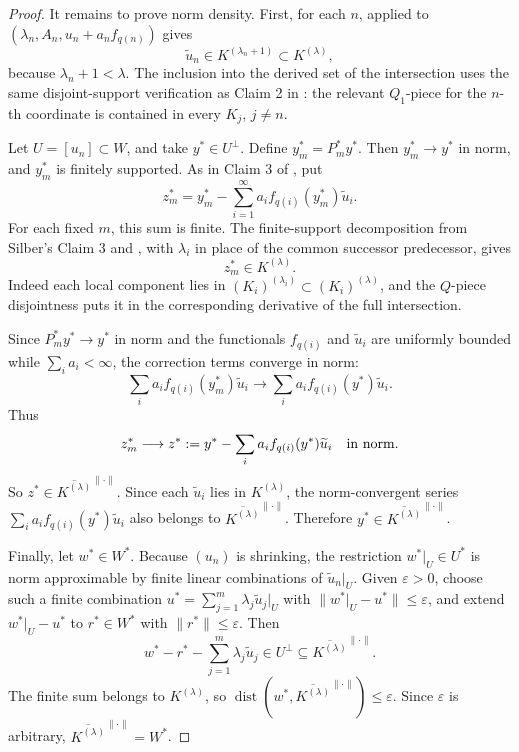 \documentclass[11pt]{article}
\newcommand{\clnorm}[1]{\overline{#1}^{\|\cdot\|}}
\begin{document}
\begin{proof}
It remains to prove norm density.  First, for each \(n\),
\cite[Lemma 2.8(a)]{Silber2022} applied to
\((\lambda_n,A_n,u_n+a_nf_{q(n)})\) gives
\[
  \widetilde u_n\in K^{(\lambda_n+1)}\subset K^{(\lambda)},
\]
because \(\lambda_n+1<\lambda\).  The inclusion into the derived set of the
intersection uses the same disjoint-support verification as Claim 2 in
\cite[Theorem 2.10]{Silber2022}: the relevant \(Q_1\)-piece for the \(n\)-th
coordinate is contained in every \(K_j\), \(j\neq n\).

Let \(U=[u_n]\subset W\), and take \(y^*\in U^\perp\).  Define
\(y_m^*=P_m^*y^*\).  Then \(y_m^*\to y^*\) in norm, and \(y_m^*\) is finitely
supported.  As in Claim 3 of \cite[Theorem 2.10]{Silber2022}, put
\[
  z_m^*
  =
  y_m^*-\sum_{i=1}^{\infty}a_i f_{q(i)}(y_m^*)\widetilde u_i .
\]
For each fixed \(m\), this sum is finite.  The finite-support decomposition
from Silber's Claim 3 and \cite[Lemma 2.8(b)]{Silber2022}, with
\(\lambda_i\) in place of the common successor predecessor, gives
\[
  z_m^*\in K^{(\lambda)} .
\]
Indeed each local component lies in
\((K_i)^{(\lambda_i)}\subset (K_i)^{(\lambda)}\), and the \(Q\)-piece
disjointness puts it in the corresponding derivative of the full intersection.

Since \(P_m^*y^*\to y^*\) in norm and the functionals \(f_{q(i)}\) and
\(\widetilde u_i\) are uniformly bounded while \(\sum_i a_i<\infty\), the
correction terms converge in norm:
\[
  \sum_i a_i f_{q(i)}(y_m^*)\widetilde u_i
  \longrightarrow
  \sum_i a_i f_{q(i)}(y^*)\widetilde u_i .
\]
Thus
\[
  z_m^*\longrightarrow
  z^*:=y^*-\sum_i a_i f_{q(i)}(y^*)\widetilde u_i
  \quad\hbox{in norm}.
\]
So \(z^*\in\clnorm{K^{(\lambda)}}\).  Since each \(\widetilde u_i\) lies in
\(K^{(\lambda)}\), the norm-convergent series
\(\sum_i a_i f_{q(i)}(y^*)\widetilde u_i\) also belongs to
\(\clnorm{K^{(\lambda)}}\).  Therefore \(y^*\in\clnorm{K^{(\lambda)}}\).

Finally, let \(w^*\in W^*\).  Because \((u_n)\) is shrinking, the restriction
\(w^*|_U\in U^*\) is norm approximable by finite linear combinations of
\(\widetilde u_n|_U\).  Given \(\varepsilon>0\), choose such a finite
combination \(u^*=\sum_{j=1}^m\lambda_j\widetilde u_j|_U\) with
\(\|w^*|_U-u^*\|\leq\varepsilon\), and extend \(w^*|_U-u^*\) to
\(r^*\in W^*\) with \(\|r^*\|\leq\varepsilon\).  Then
\[
  w^*-r^*-\sum_{j=1}^m\lambda_j\widetilde u_j\in U^\perp
  \subseteq \clnorm{K^{(\lambda)}}.
\]
The finite sum belongs to \(K^{(\lambda)}\), so
\(\operatorname{dist}(w^*,\clnorm{K^{(\lambda)}})\leq\varepsilon\).  Since
\(\varepsilon\) is arbitrary, \(\clnorm{K^{(\lambda)}}=W^*\).
\end{proof}
\end{document}
